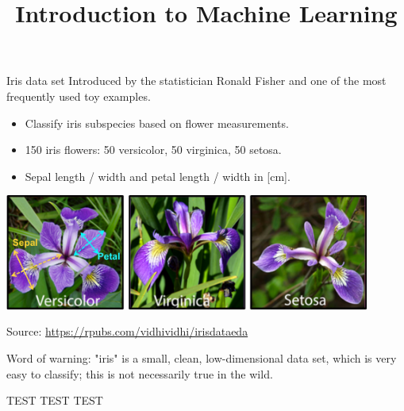 




\newcommand{\titlefigure}{figure/sample-dgp-2d.pdf}
\newcommand{\learninggoals}{
\item Understand structure of tabular data in ML
\item Understand difference between target and features
\item Understand difference between labeled and unlabeled data
\item Know concept of data-generating process}

\title{Introduction to Machine Learning}
\date{}




\begin{vbframe}{Iris data set}
Introduced by the statistician Ronald Fisher and one
of the most frequently used toy examples.
\begin{itemize}
\item Classify iris subspecies based on flower measurements.
\item 150 iris flowers: 50 versicolor, 50 virginica, 50 setosa.
\item Sepal length / width and petal length / width in [cm].
\end{itemize}

\begin{center}
\includegraphics[width=0.9\textwidth]{figure_man/iris_species.png}

\tiny
Source: \url{https://rpubs.com/vidhividhi/irisdataeda}
\normalsize
\end{center}

Word of warning: "iris" is a small, clean, low-dimensional data set,
which is very easy to classify; this is not necessarily true in the wild.

TEST TEST TEST

\end{vbframe}

